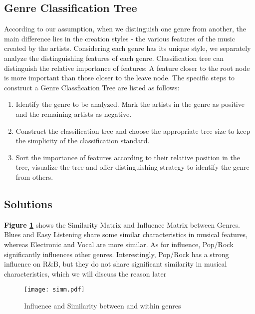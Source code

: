 \documentclass[12pt]{article}  %
\begin{document}
	\subsection{Genre Classification Tree}
	
	According to our assumption, when we distinguish one genre from another, the main difference lies in the creation styles - the various features of the music created by the artists.
	Considering each genre has its unique style, we separately analyze the distinguishing features
	of each genre.
	Classification tree can distinguish the relative importance of features: A feature closer to the
	root node is more important than those closer to the leave node. The specific steps to construct
	a Genre Classfication Tree are listed as follows:
	
	\begin{enumerate}[\bfseries 1.]
		\setlength{\parsep}{2ex} %
		\setlength{\topsep}{2ex} %
		\setlength{\itemsep}{1ex} %
		\item Identify the genre to be analyzed. Mark the artists in the genre as positive and the remaining artists as negative.
		\item Construct the classification tree and choose the appropriate tree size to keep the simplicity of the classification standard.
		\item Sort the importance of features according to their relative position in the tree, visualize the tree and offer distinguishing strategy to identify the genre from others.
		
	\end{enumerate}
	
	\subsection{Solutions}
	
	\textbf{Figure \ref{fig:simm}} shows the Similarity Matrix and Influence Matrix between Genres. Blues and Easy Listening share some similar characteristics in musical features, whereas Electronic and Vocal are more similar. As for influence, Pop/Rock significantly influences other genres. Interestingly, Pop/Rock has a strong influence on R\&B, but they do not share significant similarity in musical characteristics, which we will discuss the reason later
	
	\begin{figure}[htbp]
		\centering
		\texttt{[image: simm.pdf]} 	%
		\caption{Influence and Similarity between and within genres}		%
		\label{fig:simm}							%
	\end{figure}
	
\end{document}
